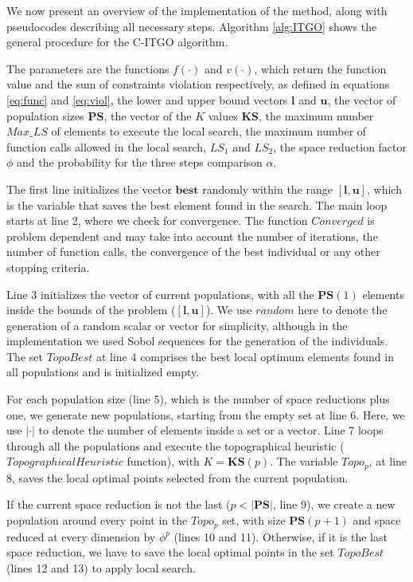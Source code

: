 We now present an overview of the implementation of the method, along with pseudocodes describing all necessary steps. Algorithm \ref{alg:ITGO} shows the general procedure for the C-ITGO algorithm.

The parameters are the functions $f(\cdot)$ and $v(\cdot)$, which return the function value and the sum of constraints violation respectively, as defined in equations \ref{eq:func} and \ref{eq:viol}, the lower and upper bound vectors $\bm{l}$ and $\bm{u}$, the vector of population sizes $\bm{PS}$, the vector of the $K$ values $\bm{KS}$, the maximum number $Max\_LS$ of elements to execute the local search, the maximum number of function calls allowed in the local search, $LS_1$ and $LS_2$, the space reduction factor $\phi$ and the probability for the three steps comparison $\alpha$.






The first line initializes the vector $\bm{best}$ randomly within the range $[\bm{l}, \bm{u}]$, which is the variable that saves the best element found in the search. The main loop starts at line 2, where we check for convergence. The function $Converged$ is problem dependent and may take into account the number of iterations, the number of function calls, the convergence of the best individual or any other stopping criteria.

Line 3 initializes the vector of current populations, with all the $\bm{PS}(1)$ elements inside the bounds of the problem ($[\bm{l}, \bm{u}]$). We use $random$ here to denote the generation of a random scalar or vector for simplicity, although in the implementation we used Sobol sequences for the generation of the individuals. The set $TopoBest$ at line 4 comprises the best local optimum elements found in all populations and is initialized empty.

For each population size (line 5), which is the number of space reductions plus one, we generate new populations, starting from the empty set at line 6. Here, we use $|\cdot|$ to denote the number of elements inside a set or a vector. Line 7 loops through all the populations and execute the topographical heuristic ($TopographicalHeuristic$ function), with $K = \bm{KS}(p)$. The variable $Topo_p$, at line 8, saves the local optimal points selected from the current population.

If the current space reduction is not the last ($p < |\bm{PS}|$, line 9), we create a new population around every point in the $Topo_p$ set, with size $\bm{PS}(p + 1)$ and space reduced at every dimension by $\phi^p$ (lines 10 and 11). Otherwise, if it is the last space reduction, we have to save the local optimal points in the set $TopoBest$ (lines 12 and 13) to apply local search.

